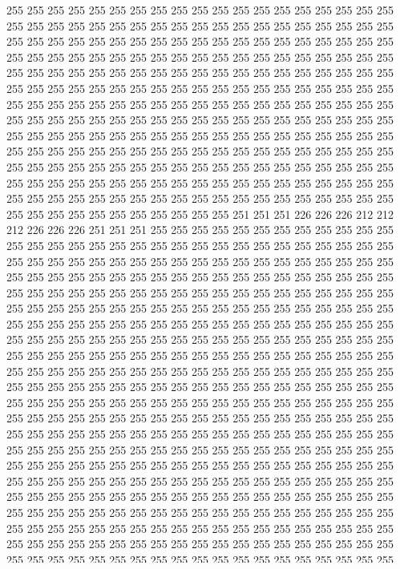 255 255 255 255 255 255 255 255 255 255 255 255 255 255 255 255 255 255 255 255 255 255 255 255 255 255 255 255 255 255 255 255 255 255 255 255 255 255 255 255 255 255 255 255 255 255 255 255 255 255 255 255 255 255 255 255 255 255 255 255 255 255 255 255 255 255 255 255 255 255 255 255 255 255 255 255 255 255 255 255 255 255 255 255 255 255 255 255 255 255 255 255 255 255 255 255 255 255 255 255 255 255 255 255 255 255 255 255 255 255 255 255 255 255 255 255 255 255 255 255 255 255 255 255 255 255 255 255 
255 255 255 255 255 255 255 255 255 255 255 255 255 255 255 255 255 255 255 255 255 255 255 255 255 255 255 255 255 255 255 255 255 255 255 255 255 255 255 255 255 255 255 255 255 255 255 255 255 255 255 255 255 255 255 255 255 255 255 255 255 255 255 255 255 255 255 255 255 255 255 255 255 255 255 255 255 255 255 255 255 255 255 255 255 255 255 255 255 255 255 255 255 255 255 255 255 255 255 255 255 255 255 255 255 255 255 255 255 255 255 255 255 255 255 255 255 255 255 255 255 255 255 255 255 255 255 255 
255 255 251 251 251 226 226 226 212 212 212 226 226 226 251 251 251 255 255 255 255 255 255 255 255 255 255 255 255 255 255 255 255 255 255 255 255 255 255 255 255 255 255 255 255 255 255 255 255 255 255 255 255 255 255 255 255 255 255 255 255 255 255 255 255 255 255 255 255 255 255 255 255 255 255 255 255 255 255 255 255 255 255 255 255 255 255 255 255 255 255 255 255 255 255 255 255 255 255 255 255 255 255 255 255 255 255 255 255 255 255 255 255 255 255 255 255 255 255 255 255 255 255 255 255 255 255 255 
255 255 255 255 255 255 255 255 255 255 255 255 255 255 255 255 255 255 255 255 255 255 255 255 255 255 255 255 255 255 255 255 255 255 255 255 255 255 255 255 255 255 255 255 255 255 255 255 255 255 255 255 255 255 255 255 255 255 255 255 255 255 255 255 255 255 255 255 255 255 255 255 255 255 255 255 255 255 255 255 255 255 255 255 255 255 255 255 255 255 255 255 255 255 255 255 255 255 255 255 255 255 255 255 255 255 255 255 255 255 255 255 255 255 255 255 255 255 255 255 255 255 255 255 255 255 255 255 
255 255 255 255 255 255 255 255 255 255 255 255 255 255 255 255 255 255 255 255 255 255 255 255 255 255 255 255 255 255 255 255 255 255 255 255 255 255 255 255 255 255 255 255 255 255 255 255 255 255 255 255 255 255 255 255 255 255 255 255 255 255 255 255 255 255 255 255 255 255 255 255 255 255 255 255 255 255 255 255 255 255 255 255 255 255 255 255 255 255 255 255 255 255 255 255 255 255 255 255 255 255 255 255 255 255 255 255 255 255 255 255 255 255 255 255 255 255 255 255 255 255 255 255 255 255 255 255 
255 255 255 255 255 255 255 255 255 255 255 255 255 255 255 255 255 255 255 255 255 255 255 255 255 255 255 255 255 255 255 255 255 255 255 255 255 255 255 255 255 255 255 255 255 255 255 255 255 255 255 255 255 255 255 255 255 255 255 255 255 255 255 255 255 255 255 255 255 255 255 255 255 255 255 255 255 255 255 255 255 255 255 255 255 255 255 255 255 255 255 255 255 255 255 255 255 255 255 255 255 255 255 255 255 255 255 255 255 255 255 255 255 255 255 255 255 255 255 255 255 255 255 255 255 255 255 255 
